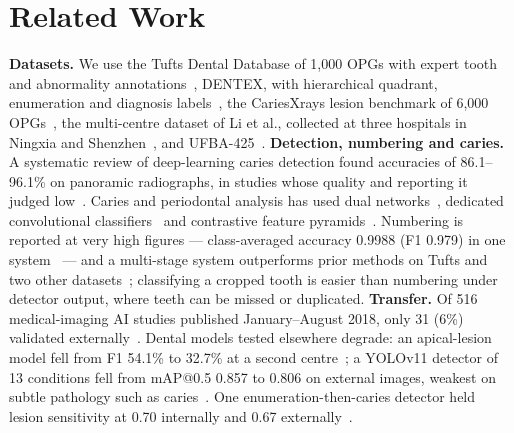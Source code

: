 \documentclass[conference]{IEEEtran}
\begin{document}
\section{Related Work}

\textbf{Datasets.} We use the Tufts Dental Database of 1,000 OPGs with expert tooth and abnormality annotations~\cite{panetta2022tufts}, DENTEX, with hierarchical quadrant, enumeration and diagnosis labels~\cite{hamamci2023dentex}, the CariesXrays lesion benchmark of 6,000 OPGs~\cite{chen2024cariesxrays}, the multi-centre dataset of Li et al., collected at three hospitals in Ningxia and Shenzhen~\cite{li2024multicenter}, and UFBA-425~\cite{budagam2024oralbbnet}. \textbf{Detection, numbering and caries.} A systematic review of deep-learning caries detection found accuracies of 86.1–96.1\% on panoramic radiographs, in studies whose quality and reporting it judged low~\cite{mohammadrahimi2022deep}. Caries and periodontal analysis has used dual networks~\cite{lim2024dual}, dedicated convolutional classifiers~\cite{bilal2024pdcnet} and contrastive feature pyramids~\cite{chen2024cariesxrays}. Numbering is reported at very high figures — class-averaged accuracy 0.9988 (F1 0.979) in one system~\cite{zancan2025ai} — and a multi-stage system outperforms prior methods on Tufts and two other datasets~\cite{zhang2025reliable}; classifying a cropped tooth is easier than numbering under detector output, where teeth can be missed or duplicated. \textbf{Transfer.} Of 516 medical-imaging AI studies published January–August 2018, only 31 (6\%) validated externally~\cite{kim2019design}. Dental models tested elsewhere degrade: an apical-lesion model fell from F1 54.1\% to 32.7\% at a second centre~\cite{krois2021generalizability}; a YOLOv11 detector of 13 conditions fell from mAP@0.5 0.857 to 0.806 on external images, weakest on subtle pathology such as caries~\cite{mutlu2026comparison}. One enumeration-then-caries detector held lesion sensitivity at 0.70 internally and 0.67 externally~\cite{bizjak2024advancing}.
\end{document}
